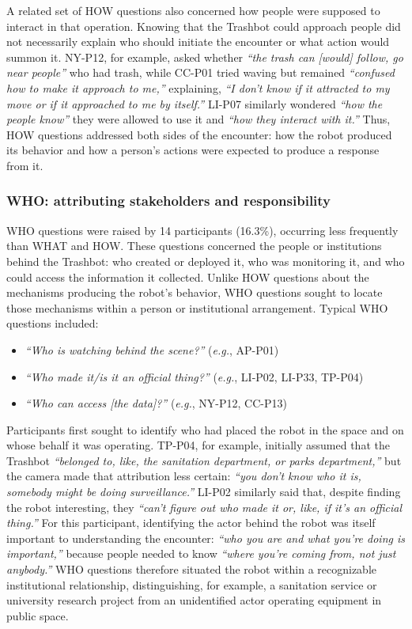 A related set of HOW questions also concerned how people were supposed to interact in that operation. Knowing that the Trashbot could approach people did not necessarily explain who should initiate the encounter or what action would summon it. NY-P12, for example, asked whether \emph{``the trash can [would] follow, go near people''} who had trash, while CC-P01 tried waving but remained \emph{``confused how to make it approach to me,''} explaining, \emph{``I don't know if it attracted to my move or if it approached to me by itself.''} LI-P07 similarly wondered \emph{``how the people know''} they were allowed to use it and \emph{``how they interact with it.''} Thus, HOW questions addressed both sides of the encounter: how the robot produced its behavior and how a person's actions were expected to produce a response from it.

\subsubsection{WHO: attributing stakeholders and responsibility}
WHO questions were raised by 14 participants (16.3\%), occurring less frequently than WHAT and HOW. These questions concerned the people or institutions behind the Trashbot: who created or deployed it, who was monitoring it, and who could access the information it collected. Unlike HOW questions about the mechanisms producing the robot's behavior, WHO questions sought to locate those mechanisms within a person or institutional arrangement. Typical WHO questions included:

\begin{itemize}
    \item \emph{``Who is watching behind the scene?''} (\textit{e.g.}, AP-P01)
    \item \emph{``Who made it/is it an official thing?''} (\textit{e.g.}, LI-P02, LI-P33, TP-P04)
    \item \emph{``Who can access [the data]?''} (\textit{e.g.}, NY-P12, CC-P13)
\end{itemize}

Participants first sought to identify who had placed the robot in the space and on whose behalf it was operating. TP-P04, for example, initially assumed that the Trashbot \emph{``belonged to, like, the sanitation department, or parks department,''} but the camera made that attribution less certain: \emph{``you don't know who it is, somebody might be doing surveillance.''} LI-P02 similarly said that, despite finding the robot interesting, they \emph{``can't figure out who made it or, like, if it's an official thing.''} For this participant, identifying the actor behind the robot was itself important to understanding the encounter: \emph{``who you are and what you're doing is important,''} because people needed to know \emph{``where you're coming from, not just anybody.''} WHO questions therefore situated the robot within a recognizable institutional relationship, distinguishing, for example, a sanitation service or university research project from an unidentified actor operating equipment in public space.

